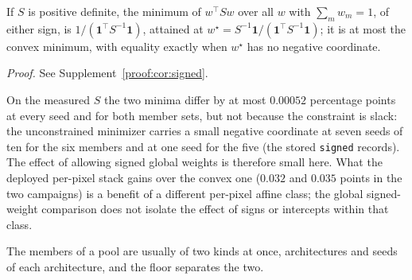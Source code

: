 \begin{corollary}\label{cor:signed}
If $S$ is positive definite, the minimum of $w^\top Sw$ over all $w$ with
$\sum_m w_m=1$, of either sign, is $1/(\mathbf 1^\top S^{-1}\mathbf 1)$,
attained at $w^\star=S^{-1}\mathbf 1/(\mathbf 1^\top S^{-1}\mathbf 1)$; it
is at most the convex minimum, with equality exactly when $w^\star$ has no
negative coordinate.
\end{corollary}
\noindent\emph{Proof.} See Supplement~\ref{proof:cor:signed}.


On the measured $S$ the two minima differ by at most $0.00052$ percentage points at every
seed and for both member sets, but not because the constraint is slack: the
unconstrained minimizer carries a small negative coordinate at seven seeds of
ten for the six members and at one seed for the five (the stored
\texttt{signed} records). The effect of allowing signed global weights is
therefore small here. What the deployed per-pixel stack gains over the convex
one ($0.032$ and $0.035$ points in the two campaigns) is a benefit of a different per-pixel affine class; the global signed-weight comparison does not isolate the effect of signs or intercepts within that class.

The members of a pool are usually of two kinds at once, architectures and
seeds of each architecture, and the floor separates the two.

